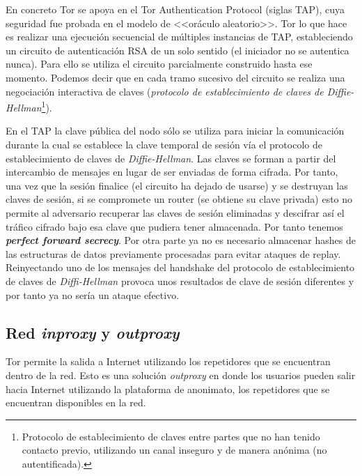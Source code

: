 \documentclass[a4paper, 11pt, titlepage]{article}
\begin{document}
            En concreto Tor se apoya en el Tor Authentication Protocol (siglas TAP), cuya seguridad fue probada en el modelo 
            de <<oráculo aleatorio>>. Tor lo que hace es realizar una ejecución secuencial de múltiples instancias de TAP, 
            estableciendo un circuito de autenticación RSA de un solo sentido (el iniciador no se autentica nunca). Para 
            ello se utiliza el circuito parcialmente construido hasta ese momento. Podemos decir que en cada tramo sucesivo 
            del circuito se realiza una negociación interactiva de claves (\emph{protocolo de establecimiento de claves de 
            Diffie-Hellman}\footnote{Protocolo de establecimiento de claves entre partes que no han tenido contacto previo, 
            utilizando un canal inseguro y de manera anónima (no autentificada).}). 

            En el TAP la clave pública del nodo sólo se utiliza para iniciar la comunicación durante la cual se establece 
            la clave temporal de sesión vía el protocolo de establecimiento de claves de \emph{Diffie-Hellman}. Las claves 
            se forman a partir del intercambio de mensajes en lugar de ser enviadas de forma cifrada. Por tanto, una vez 
            que la sesión finalice (el circuito ha dejado de usarse) y se destruyan las claves de sesión, si se compromete 
            un router (se obtiene su clave privada) esto no permite al adversario recuperar las claves de sesión eliminadas 
            y descifrar así el tráfico cifrado bajo esa clave que pudiera tener almacenada. Por tanto tenemos 
            \emph{\textbf{perfect forward secrecy}}. Por otra parte ya no es necesario almacenar hashes de las estructuras 
            de datos previamente procesadas para evitar ataques de replay. Reinyectando uno de los mensajes del handshake 
            del protocolo de establecimiento de claves de \emph{Diffi-Hellman} provoca unos resultados de clave de sesión 
            diferentes y por tanto ya no sería un ataque efectivo.

    \subsection{Red \emph{inproxy} y \emph{outproxy}}

        Tor permite la salida a Internet utilizando los repetidores que se encuentran dentro de la red. Esto es una solución 
        \emph{outproxy} en donde los usuarios pueden salir hacia Internet utilizando la plataforma de anonimato, los 
        repetidores que se encuentran disponibles en la red. 
\end{document}
